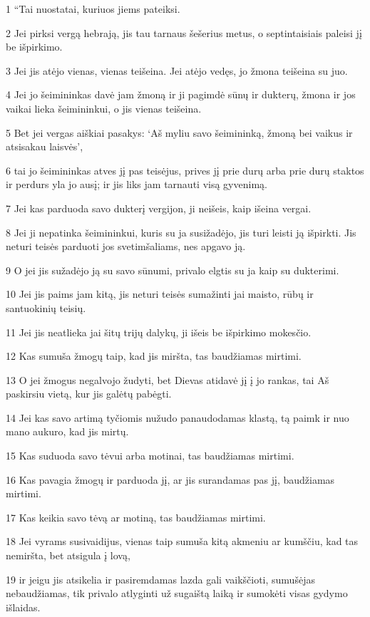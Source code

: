 \par 1 “Tai nuostatai, kuriuos jiems pateiksi. 
\par 2 Jei pirksi vergą hebrają, jis tau tarnaus šešerius metus, o septintaisiais paleisi jį be išpirkimo. 
\par 3 Jei jis atėjo vienas, vienas teišeina. Jei atėjo vedęs, jo žmona teišeina su juo. 
\par 4 Jei jo šeimininkas davė jam žmoną ir ji pagimdė sūnų ir dukterų, žmona ir jos vaikai lieka šeimininkui, o jis vienas teišeina. 
\par 5 Bet jei vergas aiškiai pasakys: ‘Aš myliu savo šeimininką, žmoną bei vaikus ir atsisakau laisvės’, 
\par 6 tai jo šeimininkas atves jį pas teisėjus, prives jį prie durų arba prie durų staktos ir perdurs yla jo ausį; ir jis liks jam tarnauti visą gyvenimą. 
\par 7 Jei kas parduoda savo dukterį vergijon, ji neišeis, kaip išeina vergai. 
\par 8 Jei ji nepatinka šeimininkui, kuris su ja susižadėjo, jis turi leisti ją išpirkti. Jis neturi teisės parduoti jos svetimšaliams, nes apgavo ją. 
\par 9 O jei jis sužadėjo ją su savo sūnumi, privalo elgtis su ja kaip su dukterimi. 
\par 10 Jei jis paims jam kitą, jis neturi teisės sumažinti jai maisto, rūbų ir santuokinių teisių. 
\par 11 Jei jis neatlieka jai šitų trijų dalykų, ji išeis be išpirkimo mokesčio. 
\par 12 Kas sumuša žmogų taip, kad jis miršta, tas baudžiamas mirtimi. 
\par 13 O jei žmogus negalvojo žudyti, bet Dievas atidavė jį į jo rankas, tai Aš paskirsiu vietą, kur jis galėtų pabėgti. 
\par 14 Jei kas savo artimą tyčiomis nužudo panaudodamas klastą, tą paimk ir nuo mano aukuro, kad jis mirtų. 
\par 15 Kas suduoda savo tėvui arba motinai, tas baudžiamas mirtimi. 
\par 16 Kas pavagia žmogų ir parduoda jį, ar jis surandamas pas jį, baudžiamas mirtimi. 
\par 17 Kas keikia savo tėvą ar motiną, tas baudžiamas mirtimi. 
\par 18 Jei vyrams susivaidijus, vienas taip sumuša kitą akmeniu ar kumščiu, kad tas nemiršta, bet atsigula į lovą, 
\par 19 ir jeigu jis atsikelia ir pasiremdamas lazda gali vaikščioti, sumušėjas nebaudžiamas, tik privalo atlyginti už sugaištą laiką ir sumokėti visas gydymo išlaidas. 
